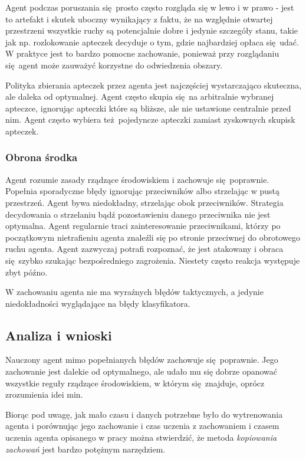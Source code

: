 \documentclass[polish,master,a4paper,oneside]{ppfcmthesis}
\begin{document}
Agent podczas poruszania się prosto często rozgląda się w lewo i w prawo - jest to artefakt i skutek uboczny wynikający z faktu, że na względnie otwartej przestrzeni wszystkie ruchy są potencjalnie dobre i jedynie szczegóły stanu, takie jak np. rozlokowanie apteczek decyduje o tym, gdzie najbardziej opłaca się udać. W praktyce jest to bardzo pomocne zachowanie, ponieważ przy rozglądaniu się agent może zauważyć korzystne do odwiedzenia obszary.

Polityka zbierania apteczek przez agenta jest najczęściej wystarczająco skuteczna, ale daleka od optymalnej. Agent często skupia się na arbitralnie wybranej apteczce, ignorując apteczki które są bliższe, ale nie ustawione centralnie przed nim. Agent często wybiera też pojedyncze apteczki zamiast zyskownych skupisk apteczek.

\subsubsection{Obrona środka}
Agent rozumie zasady rządzące środowiskiem i zachowuje się poprawnie. Popełnia sporadyczne błędy ignorując przeciwników albo strzelając w pustą przestrzeń. Agent bywa niedokładny, strzelając obok przeciwników. Strategia decydowania o strzelaniu bądź pozostawieniu danego przeciwnika nie jest optymalna. Agent regularnie traci zainteresowanie przeciwnikami, którzy po początkowym nietrafieniu agenta znaleźli się po stronie przeciwnej do obrotowego ruchu agenta. Agent zazwyczaj potrafi rozpoznać, że jest atakowany i obraca się szybko szukając bezpośredniego zagrożenia. Niestety często reakcja występuje zbyt późno.

W zachowaniu agenta nie ma wyraźnych błędów taktycznych, a jedynie niedokładności wyglądające na błędy klasyfikatora.

\subsection{Analiza i wnioski}
Nauczony agent mimo popełnianych błędów zachowuje się poprawnie. Jego zachowanie jest dalekie od optymalnego, ale udało mu się dobrze opanować wszystkie reguły rządzące środowiskiem, w którym się znajduje, oprócz zrozumienia idei min.

Biorąc pod uwagę, jak mało czasu i danych potrzebne było do wytrenowania agenta i porównując jego zachowanie i czas uczenia z zachowaniem i czasem uczenia agenta opisanego w pracy \cite{DBLP:journals/corr/KempkaWRTJ16} można stwierdzić, że metoda \textit{kopiowania zachowań} jest bardzo potężnym narzędziem. 
\end{document}
